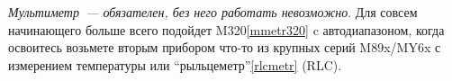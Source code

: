 \secdown





% 
% 
% 
% 
% 
% 
% 
% 
% 

\secdown

\label{mmetr}

\emph{Мультиметр\ --- обязателен, без него работать невозможно}.
Для совсем начинающего больше всего подойдет M320\ref{mmetr320} c
автодиапазоном, когда освоитесь возьмете вторым прибором что-то из крупных серий
M89x/MY6x с измерением температуры
или ``рыльцеметр''\ref{rlcmetr} (RLC).

